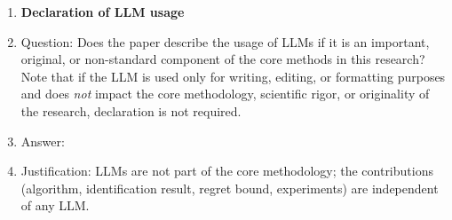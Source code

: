 \begin{enumerate}
\item {\bf Declaration of LLM usage}
    \item[] Question: Does the paper describe the usage of LLMs if it is an important, original, or non-standard component of the core methods in this research? Note that if the LLM is used only for writing, editing, or formatting purposes and does \emph{not} impact the core methodology, scientific rigor, or originality of the research, declaration is not required.
    \item[] Answer: \answerNA{}
    \item[] Justification: LLMs are not part of the core methodology; the contributions (algorithm, identification result, regret bound, experiments) are independent of any LLM.

\end{enumerate}
